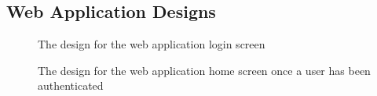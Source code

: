 \documentclass[a4paper,11pt]{report}
\begin{document}
\begin{appendix}
    \section{Web Application Designs}
    \label{appendix:webDesign}
        \begin{figure}[H]
            \centering
            \caption{The design for the web application login screen}
            \label{fig:mobileUIpt2}
        \end{figure}
        \begin{figure}[H]
            \centering
            \caption{The design for the web application home screen once a user has been authenticated}
            \label{fig:mobileUIpt2}
        \end{figure}
        \begin{figure}[H]
            \centering

\end{figure}
\end{appendix}
\end{document}
